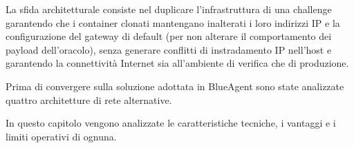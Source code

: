 La sfida architetturale consiste nel duplicare l'infrastruttura di una
challenge garantendo che i container clonati mantengano inalterati i
loro indirizzi IP e la configurazione del gateway di default (per non
alterare il comportamento dei payload dell'oracolo), senza generare
conflitti di instradamento IP nell'host e garantendo la connettività
Internet sia all'ambiente di verifica che di produzione.

Prima di convergere sulla soluzione adottata in BlueAgent sono state
analizzate quattro architetture di rete alternative.

In questo capitolo vengono analizzate le caratteristiche tecniche, i
vantaggi e i limiti operativi di ognuna.
